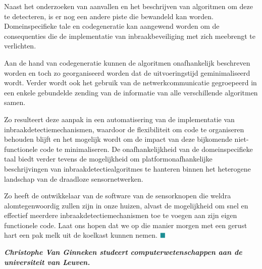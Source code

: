 \documentclass[DIV=calc,paper=a4,fontsize=11pt,twocolumn,draft]{scrartcl}
\begin{document}
Naast het onderzoeken van aanvallen en het beschrijven van algoritmen om deze
te detecteren, is er nog een andere piste die bewandeld kan worden.
Domeinspecifieke tale en codegeneratie kan aangewend worden om de consequenties
die de implementatie van inbraakbeveiliging met zich meebrengt te verlichten.

Aan de hand van codegeneratie kunnen de algoritmen onafhankelijk beschreven
worden en toch zo georganiseerd worden dat de uitvoeringstijd geminimaliseerd
wordt. Verder wordt ook het gebruik van de netwerkcommunicatie gegroepeerd in
een enkele gebundelde zending van de informatie van alle verschillende
algoritmen samen.

Zo resulteert deze aanpak in een automatisering van de implementatie van
inbraakdetectiemechanismen, waardoor de flexibiliteit om code te organiseren
behouden blijft en het mogelijk wordt om de impact van deze bijkomende
niet-functionele code te minimaliseren. De onafhankelijkheid van de
domeinspecifieke taal biedt verder tevens de mogelijkheid om
platformonafhankelijke beschrijvingen van inbraakdetectiealgoritmes te hanteren
binnen het heterogene landschap van de draadloze sensornetwerken.

Zo heeft de ontwikkelaar van de software van de sensorknopen die weldra
alomtegenwoordig zullen zijn in onze huizen, alvast de mogelijkheid om snel en
effectief meerdere inbraakdetectiemechanismen toe te voegen aan zijn eigen
functionele code. Laat ons hopen dat we op die manier morgen met een gerust
hart een pak melk uit de koelkast kunnen nemen. $\color{BaseColor}\blacksquare$

\vspace{0.6cm}

\bf{\emph{Christophe Van Ginneken studeert computerwetenschappen aan de
universiteit van Leuven.}}
\end{document}
